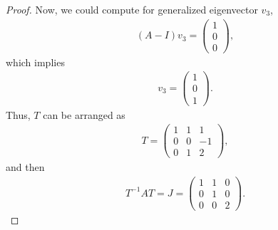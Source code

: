 \documentclass[11pt]{book}
\theoremstyle{definition}
\numberwithin{equation}{chapter}
\begin{document}
\begin{proof}
Now, we could compute for generalized eigenvector $v_3$,
\begin{align*}
    (A - I)v_3 = \begin{pmatrix}
        1 \\
        0 \\
        0
    \end{pmatrix},
\end{align*}
which implies 
\begin{align*}
    v_3 = \begin{pmatrix}
        1 \\
        0 \\
        1
    \end{pmatrix}.
\end{align*}
Thus, $T$ can be arranged as
\begin{align*}
    T = \begin{pmatrix}
        1 & 1 & 1 \\
        0 & 0 & -1 \\
        0 & 1 & 2
    \end{pmatrix},
\end{align*}
and then
\begin{align*}
    T^{-1} A T = J = \begin{pmatrix}
        1 & 1 & 0 \\
        0 & 1 & 0 \\
        0 & 0 & 2
    \end{pmatrix}.
\end{align*}
\end{proof}

\medskip
\end{document}

